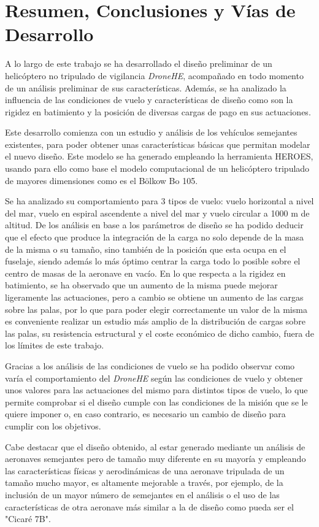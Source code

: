 \chapter{Resumen, Conclusiones y Vías de Desarrollo}

A lo largo de este trabajo se ha desarrollado el diseño preliminar de un helicóptero no tripulado de vigilancia \emph{DroneHE}, acompañado en todo momento de un análisis preliminar de sus características. Además, se ha analizado la influencia de las condiciones de vuelo y características de diseño como son la rigidez en batimiento y la posición de diversas cargas de pago en sus actuaciones.

Este desarrollo comienza con un estudio y análisis de los vehículos semejantes existentes, para poder obtener unas características básicas que permitan modelar el nuevo diseño. Este modelo se ha generado empleando la herramienta HEROES, usando para ello como base el modelo computacional de un helicóptero tripulado de mayores dimensiones como es el Bölkow Bo 105.

Se ha analizado su comportamiento para 3 tipos de vuelo: vuelo horizontal a nivel del mar, vuelo en espiral ascendente a nivel del mar y vuelo circular a 1000 m de altitud. De los análisis en base a los parámetros de diseño se ha podido deducir que el efecto que produce la integración de la carga no solo depende de la masa de la misma o su tamaño, sino también de la posición que esta ocupa en el fuselaje, siendo además lo más óptimo centrar la carga todo lo posible sobre el centro de masas de la aeronave en vacío. En lo que respecta a la rigidez en batimiento, se ha observado que un aumento de la misma puede mejorar ligeramente las actuaciones, pero a cambio se obtiene un aumento de las cargas sobre las palas, por lo que para poder elegir correctamente un valor de la misma es conveniente realizar un estudio más amplio de la distribución de cargas sobre las palas, su resistencia estructural y el coste económico de dicho cambio, fuera de los límites de este trabajo.

Gracias a los análisis de las condiciones de vuelo se ha podido observar como varía el comportamiento del \emph{DroneHE} según las condiciones de vuelo y obtener unos valores para las actuaciones del mismo para distintos tipos de vuelo, lo que permite comprobar si el diseño cumple con las condiciones de la misión que se le quiere imponer o, en caso contrario, es necesario un cambio de diseño para cumplir con los objetivos.

Cabe destacar que el diseño obtenido, al estar generado mediante un análisis de aeronaves semejantes pero de tamaño muy diferente en su mayoría y empleando las características físicas y aerodinámicas de una aeronave tripulada de un tamaño mucho mayor, es altamente mejorable a través, por ejemplo, de la inclusión de un mayor número de semejantes en el análisis o el uso de las características de otra aeronave más similar a la de diseño como pueda ser el "Cicaré 7B".


